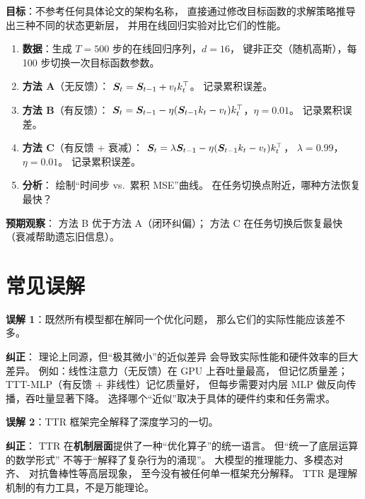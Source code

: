 \begin{labbox}[title=Lab 10：从 TTR 目标函数推导并实验对比三种层]
\textbf{目标}：不参考任何具体论文的架构名称，
直接通过修改目标函数的求解策略推导出三种不同的状态更新层，
并用在线回归实验对比它们的性能。

\begin{enumerate}
  \item \textbf{数据}：生成 $T = 500$ 步的在线回归序列，$d = 16$，
    键非正交（随机高斯），每 100 步切换一次目标函数参数。

  \item \textbf{方法 A}（无反馈）：
    $\boldsymbol{S}_t = \boldsymbol{S}_{t-1} + v_t k_t^\top$。
    记录累积误差。

  \item \textbf{方法 B}（有反馈）：
    $\boldsymbol{S}_t = \boldsymbol{S}_{t-1} - \eta(\boldsymbol{S}_{t-1} k_t - v_t) k_t^\top$，$\eta = 0.01$。
    记录累积误差。

  \item \textbf{方法 C}（有反馈 + 衰减）：
    $\boldsymbol{S}_t = \lambda \boldsymbol{S}_{t-1} - \eta(\boldsymbol{S}_{t-1} k_t - v_t) k_t^\top$，
    $\lambda = 0.99$，$\eta = 0.01$。
    记录累积误差。

  \item \textbf{分析}：
    绘制``时间步 vs.\ 累积 MSE''曲线。
    在任务切换点附近，哪种方法恢复最快？
\end{enumerate}

\textbf{预期观察}：
方法 B 优于方法 A（闭环纠偏）；
方法 C 在任务切换后恢复最快（衰减帮助遗忘旧信息）。
\end{labbox}

\section{常见误解}
\label{sec:ttr_misconceptions}

\begin{misconceptionbox}
\textbf{误解 1}：既然所有模型都在解同一个优化问题，
那么它们的实际性能应该差不多。

\textbf{纠正}：
理论上同源，但``极其微小''的近似差异
会导致实际性能和硬件效率的巨大差异。
例如：线性注意力（无反馈）在 GPU 上吞吐量最高，
但记忆质量差；
TTT-MLP（有反馈 + 非线性）记忆质量好，
但每步需要对内层 MLP 做反向传播，吞吐量显著下降。
选择哪个``近似''取决于具体的硬件约束和任务需求。
\end{misconceptionbox}

\begin{misconceptionbox}
\textbf{误解 2}：TTR 框架完全解释了深度学习的一切。

\textbf{纠正}：
TTR 在\textbf{机制层面}提供了一种``优化算子''的统一语言。
但``统一了底层运算的数学形式''
不等于``解释了复杂行为的涌现''。
大模型的推理能力、多模态对齐、
对抗鲁棒性等高层现象，
至今没有被任何单一框架充分解释。
TTR 是理解机制的有力工具，不是万能理论。
\end{misconceptionbox}

